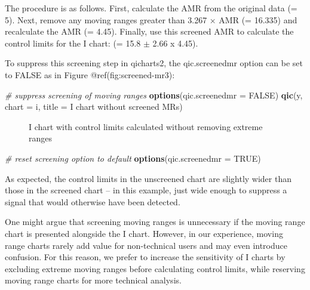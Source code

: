 \documentclass[
]{book}
\makeatletter
\newenvironment{Shaded}{\begin{snugshade}}{\end{snugshade}}
\newcommand{\AttributeTok}[1]{\textcolor[rgb]{0.13,0.29,0.53}{#1}}
\newcommand{\CommentTok}[1]{\textcolor[rgb]{0.56,0.35,0.01}{\textit{#1}}}
\newcommand{\ConstantTok}[1]{\textcolor[rgb]{0.56,0.35,0.01}{#1}}
\newcommand{\FunctionTok}[1]{\textcolor[rgb]{0.13,0.29,0.53}{\textbf{#1}}}
\newcommand{\NormalTok}[1]{#1}
\newcommand{\StringTok}[1]{\textcolor[rgb]{0.31,0.60,0.02}{#1}}
\newcommand*\pandocbounded[1]{%
  \sbox\pandoc@box{#1}%
  \Gscale@div\@tempa{\textheight}{\dimexpr\ht\pandoc@box+\dp\pandoc@box\relax}%
  \Gscale@div\@tempb{\linewidth}{\wd\pandoc@box}%
  \ifdim\@tempb\p@<\@tempa\p@\let\@tempa\@tempb\fi%
  \ifdim\@tempa\p@<\p@\scalebox{\@tempa}{\usebox\pandoc@box}%
  \else\usebox{\pandoc@box}%
  \fi%
}
\makeatother
\begin{document}
The procedure is as follows. First, calculate the AMR from the original
data (= 5). Next, remove any moving ranges greater than 3.267 × AMR (=
16.335) and recalculate the AMR (= 4.45). Finally, use this screened AMR
to calculate the control limits for the I chart: (= 15.8 \(\pm\) 2.66 x
4.45).

To suppress this screening step in qicharts2, the qic.screenedmr option
can be set to FALSE as in Figure @ref(fig:screened-mr3):

\begin{Shaded}
\begin{Highlighting}[]
\CommentTok{\# suppress screening of moving ranges}
\FunctionTok{options}\NormalTok{(}\AttributeTok{qic.screenedmr =} \ConstantTok{FALSE}\NormalTok{)}
\FunctionTok{qic}\NormalTok{(y, }
    \AttributeTok{chart =} \StringTok{\textquotesingle{}i\textquotesingle{}}\NormalTok{,}
    \AttributeTok{title =} \StringTok{\textquotesingle{}I chart without screened MRs\textquotesingle{}}\NormalTok{)}
\end{Highlighting}
\end{Shaded}

\begin{figure}
\centering
\pandocbounded{}
\caption{I chart with control limits calculated without removing extreme
ranges}
\end{figure}

\begin{Shaded}
\begin{Highlighting}[]
\CommentTok{\# reset screening option to default}
\FunctionTok{options}\NormalTok{(}\AttributeTok{qic.screenedmr =} \ConstantTok{TRUE}\NormalTok{)}
\end{Highlighting}
\end{Shaded}

As expected, the control limits in the unscreened chart are slightly
wider than those in the screened chart -- in this example, just wide
enough to suppress a signal that would otherwise have been detected.

One might argue that screening moving ranges is unnecessary if the
moving range chart is presented alongside the I chart. However, in our
experience, moving range charts rarely add value for non-technical users
and may even introduce confusion. For this reason, we prefer to increase
the sensitivity of I charts by excluding extreme moving ranges before
calculating control limits, while reserving moving range charts for more
technical analysis.
\end{document}
